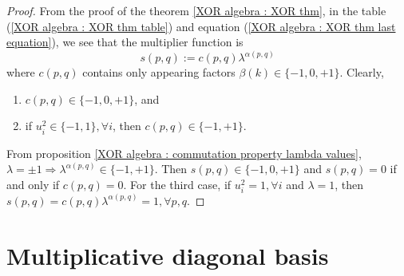\documentclass{article}
\begin{document}
\begin{proof}
    From the proof of the theorem \ref{XOR algebra : XOR thm}, in the table (\ref{XOR algebra : XOR thm table}) and equation (\ref{XOR algebra : XOR thm last equation}), we see that the multiplier function is 
    $$ s(p,q) := c(p,q)\lambda^{\alpha(p,q)} $$
    where $c(p,q)$ contains only appearing factors $\beta(k) \in \{ -1, 0 , +1 \}$. Clearly,
    \begin{enumerate}
        \item $c(p,q) \in \{ -1, 0 , +1 \}$, and
        \item if $u_i^2 \in \{ -1 ,1 \}, \forall i$, then $c(p,q) \in \{ -1 , +1 \}$.
    \end{enumerate}
    From proposition \ref{XOR algebra : commutation property lambda values}, $\lambda = \pm 1 \Rightarrow \lambda^{\alpha(p,q)} \in \{ -1,+1 \}$. Then $s(p,q) \in \{ -1, 0, +1 \}$ and $s(p,q) = 0$ if and only if $c(p,q) = 0$. For the third case, if $u_i^2 = 1, \forall i$ and $\lambda=1$, then $s(p,q) = c(p,q)\lambda^{\alpha(p,q)} = 1, \forall p,q$.
\end{proof}

\section{Multiplicative diagonal basis}
\label{section : multiplicative diagonal basis}
\end{document}
